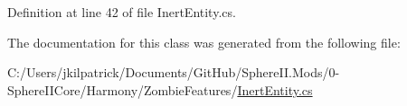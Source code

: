 Definition at line 42 of file Inert\+Entity.\+cs.



The documentation for this class was generated from the following file\+:\begin{DoxyCompactItemize}
\item 
C\+:/\+Users/jkilpatrick/\+Documents/\+Git\+Hub/\+Sphere\+I\+I.\+Mods/0-\/\+Sphere\+I\+I\+Core/\+Harmony/\+Zombie\+Features/\mbox{\hyperlink{_inert_entity_8cs}{Inert\+Entity.\+cs}}\end{DoxyCompactItemize}
